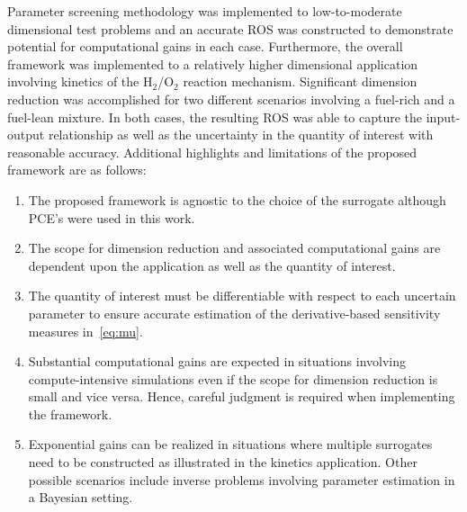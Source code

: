 Parameter screening methodology was implemented to low-to-moderate dimensional test problems
and an accurate ROS was constructed to demonstrate potential for computational gains in
each case. Furthermore, the overall framework was implemented  to a relatively higher 
dimensional application involving kinetics of the H$_2$/O$_2$ reaction mechanism. 
Significant dimension reduction was accomplished for two different scenarios involving
a fuel-rich and a fuel-lean mixture. In both cases, the resulting ROS was able to capture
the input-output relationship as well as the uncertainty in the quantity of interest with 
reasonable accuracy. Additional highlights and limitations of the proposed framework are as follows:

\begin{enumerate}
\item The proposed framework is agnostic to the choice of the surrogate although PCE's were used
in this work. 
\item The scope for dimension reduction and associated computational gains are
dependent upon the application as well as the quantity of interest. 
\item The quantity of interest must be differentiable with respect to each uncertain parameter
to ensure accurate estimation of the derivative-based sensitivity measures in~\eqref{eq:mu}.
\item Substantial computational gains are expected in situations involving compute-intensive
simulations even if the scope for dimension reduction is small and vice versa. Hence, careful judgment 
is required when implementing the framework. 
\item Exponential gains can be realized in situations where multiple surrogates need to be
constructed as illustrated in the kinetics application. Other possible scenarios 
include inverse problems involving parameter estimation in a Bayesian setting. 
\end{enumerate}

